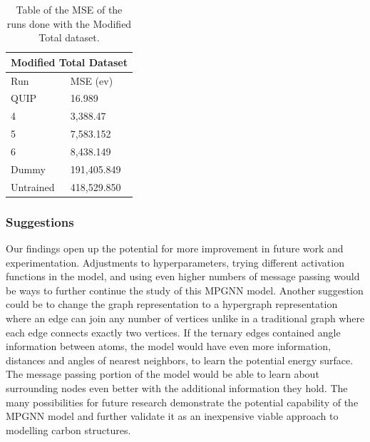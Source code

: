 \documentclass[12pt, abstract = true]{scrartcl}
\begin{document}
\begin{table}
    \centering
    \begin{tabular}{p{3cm}|p{3cm}}
    \hline
    \multicolumn{2}{|c|}{Modified Total Dataset} \\
    \hline
    Run  & MSE (ev)\\
    \hline
    QUIP   & 16.989 \\
    4   & 3,388.47 \\
    5 & 7,583.152 \\
    6    & 8,438.149\\
    Dummy & 191,405.849 \\
    Untrained & 418,529.850\\
    \hline
    \end{tabular}
    \caption{Table of the MSE of the runs done with the Modified Total dataset.}\label{tab:total}
\end{table}



\subsubsection{Suggestions} 

Our findings open up the potential for more improvement in future work and experimentation. Adjustments to hyperparameters, trying different activation functions in the model, and using even higher numbers of message passing would be ways to further continue the study of this MPGNN model. Another suggestion could be to change the graph representation to a hypergraph representation where an edge can join any number of vertices unlike in a traditional graph where each edge connects exactly two vertices. If the ternary edges contained angle information between atoms, the model would have even more information, distances and angles of nearest neighbors, to learn the potential energy surface. The message passing portion of the model would be able to learn about surrounding nodes even better with the additional information they hold. The many possibilities for future research demonstrate the potential capability of the MPGNN model and further validate it as an inexpensive viable approach to modelling carbon structures.


\newpage



\end{document}
